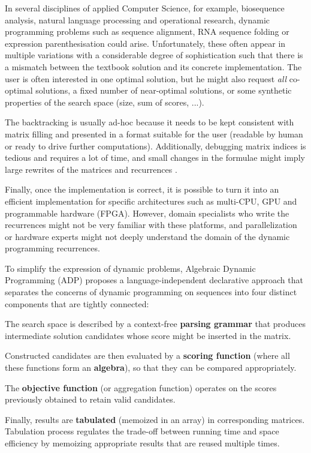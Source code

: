 In several disciplines of applied Computer Science, for example, biosequence analysis, natural language processing and operational research,  dynamic programming problems such as sequence alignment, RNA sequence folding or expression parenthesisation could arise. Unfortunately, these often appear in multiple variations with a considerable degree of sophistication such that there is a mismatch between the textbook solution and its concrete implementation. The user is often interested in one optimal solution, but he might also request \textit{all} co-optimal solutions, a fixed number of near-optimal solutions, or some synthetic properties of the search space (size, sum of scores, ...).

The backtracking is usually ad-hoc because it needs to be kept consistent with matrix filling and presented in a format suitable for the user (readable by human or ready to drive further computations). Additionally, debugging matrix indices is tedious and requires a lot of time, and small changes in the formulae might imply large rewrites of the matrices and recurrences \cite{gapc_yield}.

Finally, once the implementation is correct, it is possible to turn it into an efficient implementation for specific architectures such as multi-CPU, GPU and programmable hardware (FPGA). However, domain specialists who write the recurrences might not be very familiar with these platforms, and parallelization or hardware experts might not deeply understand the domain of the dynamic programming recurrences.

\newpage
To simplify the expression of dynamic problems, Algebraic Dynamic Programming (ADP) \cite{adp} proposes a language-independent declarative approach that separates the concerns of dynamic programming on sequences into four distinct components that are tightly connected:\ol
\item The search space is described by a context-free \textbf{parsing grammar} that produces intermediate solution candidates whose score might be inserted in the matrix.
\item Constructed candidates are then evaluated by a \textbf{scoring function} (where all these functions form an \textbf{algebra}), so that they can be compared appropriately.
\item The \textbf{objective function} (or aggregation function) operates on the scores previously obtained to retain valid candidates.
\item Finally, results are \textbf{tabulated} (memoized in an array) in corresponding matrices. Tabulation process regulates the trade-off between running time and space efficiency by memoizing appropriate results that are reused multiple times.
\ole

